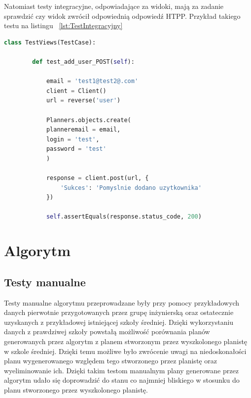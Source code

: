 Natomiast testy integracyjne, odpowiadające za widoki, mają za zadanie sprawdzić czy widok zwrócił odpowiednią odpowiedź HTPP. Przykład takiego testu na listingu ~\ref{lst:TestIntegracyjny}

\begin{lstlisting}[language=Python, caption=Implementacja przykładowego testu integracyjnego, label={lst:TestJednostkowy}]
	class TestViews(TestCase):
	
		def test_add_user_POST(self):
	
			email = 'test1@test2@.com'
			client = Client()
			url = reverse('user')
			
			Planners.objects.create(
			planneremail = email,
			login = 'test',
			password = 'test'
			)
			
			response = client.post(url, {
				'Sukces': 'Pomyslnie dodano uzytkownika'
			})
			
			self.assertEquals(response.status_code, 200)
\end{lstlisting}


\section{Algorytm}
	\subsection{Testy manualne}
	Testy manualne algorytmu przeprowadzane były przy pomocy przykładowych danych pierwotnie przygotowanych przez grupę inżynierską oraz ostatecznie uzyskanych z przykładowej istniejącej szkoły średniej. Dzięki wykorzystaniu danych z prawdziwej szkoły powstałą możliwość porównania planów generowanych przez algorytm z planem stworzonym przez wyszkolonego planistę w szkole średniej.	Dzięki temu możliwe było zwrócenie uwagi na niedoskonałości planu wygenerowanego względem tego stworzonego przez planistę oraz wyeliminowanie ich. Dzięki takim testom manualnym plany generowane przez algorytm udało się doprowadzić do stanu co najmniej bliskiego w stosunku do planu stworzonego przez wyszkolonego planistę.
	
